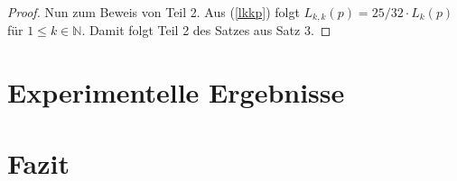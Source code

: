\documentclass[a4paper, 10pt, ngerman]{article}
\newcommand{\N}{\mathbb{N}}
\begin{document}
\begin{proof}
    Nun zum Beweis von Teil 2. Aus (\ref{lkkp}) folgt $L_{k, k}(p) = 25 / 32 \cdot L_{k}(p)$ für $1 \le k \in \N$. Damit folgt Teil 2 des Satzes aus Satz 3.
\end{proof}

\section{Experimentelle Ergebnisse}

\section{Fazit}

\printbibliography
\end{document}
